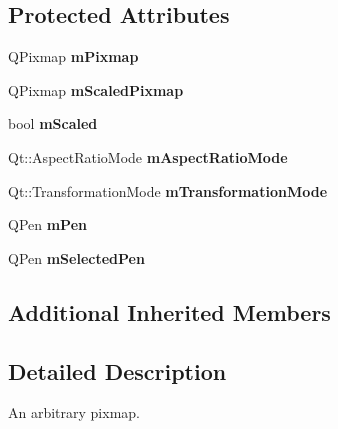 \subsection*{Protected Attributes}
\begin{DoxyCompactItemize}
\item 
Q\+Pixmap {\bfseries m\+Pixmap}\hypertarget{class_q_c_p_item_pixmap_a1396cce7f26c7b8e9512906284380c4d}{}\label{class_q_c_p_item_pixmap_a1396cce7f26c7b8e9512906284380c4d}

\item 
Q\+Pixmap {\bfseries m\+Scaled\+Pixmap}\hypertarget{class_q_c_p_item_pixmap_a2ebc66e15b9f1264563d58f29ba1bc00}{}\label{class_q_c_p_item_pixmap_a2ebc66e15b9f1264563d58f29ba1bc00}

\item 
bool {\bfseries m\+Scaled}\hypertarget{class_q_c_p_item_pixmap_a8fe670a529cd46a9b8afd9fc1203bc3f}{}\label{class_q_c_p_item_pixmap_a8fe670a529cd46a9b8afd9fc1203bc3f}

\item 
Qt\+::\+Aspect\+Ratio\+Mode {\bfseries m\+Aspect\+Ratio\+Mode}\hypertarget{class_q_c_p_item_pixmap_a8dc6b6c1e106ac523efae22d5fe55bab}{}\label{class_q_c_p_item_pixmap_a8dc6b6c1e106ac523efae22d5fe55bab}

\item 
Qt\+::\+Transformation\+Mode {\bfseries m\+Transformation\+Mode}\hypertarget{class_q_c_p_item_pixmap_ac9ecad3b9842363754e32eda2cf821bd}{}\label{class_q_c_p_item_pixmap_ac9ecad3b9842363754e32eda2cf821bd}

\item 
Q\+Pen {\bfseries m\+Pen}\hypertarget{class_q_c_p_item_pixmap_acfee1124eb51a1887aaf8de10777c7a1}{}\label{class_q_c_p_item_pixmap_acfee1124eb51a1887aaf8de10777c7a1}

\item 
Q\+Pen {\bfseries m\+Selected\+Pen}\hypertarget{class_q_c_p_item_pixmap_a0949e5bb6a261fc4e9668e28e2effcfa}{}\label{class_q_c_p_item_pixmap_a0949e5bb6a261fc4e9668e28e2effcfa}

\end{DoxyCompactItemize}
\subsection*{Additional Inherited Members}


\subsection{Detailed Description}
An arbitrary pixmap. 

